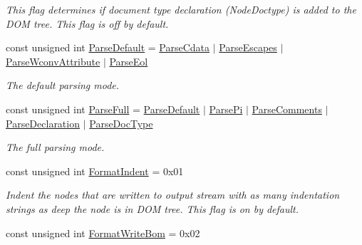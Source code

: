\begin{DoxyCompactItemize}
\begin{DoxyCompactList}\small\item\em This flag determines if document type declaration (NodeDoctype) is added to the DOM tree. This flag is off by default. \item\end{DoxyCompactList}\item 
const unsigned int \hyperlink{namespacephys_1_1xml_aa6b8f7f8c2322fd683a235b498834d60}{ParseDefault} = \hyperlink{namespacephys_1_1xml_aec00a2a16700dfd76f8f3c776bd000ac}{ParseCdata} $|$ \hyperlink{namespacephys_1_1xml_a6463412ba9e404b6890e4721255cd8ed}{ParseEscapes} $|$ \hyperlink{namespacephys_1_1xml_af9f7575e3cb8a0d8ad9a7ceee5e26983}{ParseWconvAttribute} $|$ \hyperlink{namespacephys_1_1xml_a52af747730d2b3a313eebed4cf49a333}{ParseEol}
\begin{DoxyCompactList}\small\item\em The default parsing mode. \item\end{DoxyCompactList}\item 
const unsigned int \hyperlink{namespacephys_1_1xml_af1c356f1eb063a63efebd6c8a5241c63}{ParseFull} = \hyperlink{namespacephys_1_1xml_aa6b8f7f8c2322fd683a235b498834d60}{ParseDefault} $|$ \hyperlink{namespacephys_1_1xml_a4d324954fc33d50155bae04587da13e2}{ParsePi} $|$ \hyperlink{namespacephys_1_1xml_a83ba30a7bee5a0fd4aa2f6136c8793fc}{ParseComments} $|$ \hyperlink{namespacephys_1_1xml_a463f15fc43d69ab835c8598826f65646}{ParseDeclaration} $|$ \hyperlink{namespacephys_1_1xml_adf5ee79dc4c200ad85b64a8308b0c805}{ParseDocType}
\begin{DoxyCompactList}\small\item\em The full parsing mode. \item\end{DoxyCompactList}\item 
\hypertarget{namespacephys_1_1xml_afaad0b8f59b5f103218ed5cb39b1bbde}{
const unsigned int \hyperlink{namespacephys_1_1xml_afaad0b8f59b5f103218ed5cb39b1bbde}{FormatIndent} = 0x01}
\label{d9/d27/namespacephys_1_1xml_afaad0b8f59b5f103218ed5cb39b1bbde}

\begin{DoxyCompactList}\small\item\em Indent the nodes that are written to output stream with as many indentation strings as deep the node is in DOM tree. This flag is on by default. \item\end{DoxyCompactList}\item 
\hypertarget{namespacephys_1_1xml_a76a253f60deb94ef39c255064afb6040}{
const unsigned int \hyperlink{namespacephys_1_1xml_a76a253f60deb94ef39c255064afb6040}{FormatWriteBom} = 0x02}
\label{d9/d27/namespacephys_1_1xml_a76a253f60deb94ef39c255064afb6040}


\end{DoxyCompactItemize}

